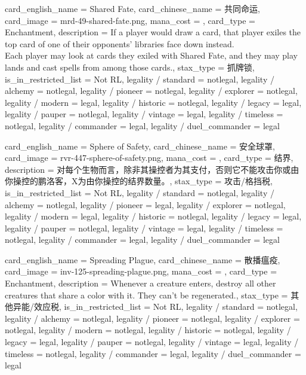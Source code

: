 \documentclass[lang = cn, color = black, 10pt]{AllThatStax}
\begin{document}
\card
{
	card_english_name = {Shared Fate},
	card_chinese_name = {共同命运},
	card_image = mrd-49-shared-fate.png,
	mana_cost = ,
	card_type = Enchantment,
	description = {If a player would draw a card, that player exiles the top card of one of their opponents' libraries face down instead.\\
		Each player may look at cards they exiled with Shared Fate, and they may play lands and cast spells from among those cards.},
	stax_type = 抓牌锁,
	is_in_restricted_list = Not RL,
	legality / standard = notlegal,
	legality / alchemy = notlegal,
	legality / pioneer = notlegal,
	legality / explorer = notlegal,
	legality / modern = legal,
	legality / historic = notlegal,
	legality / legacy = legal,
	legality / pauper = notlegal,
	legality / vintage = legal,
	legality / timeless = notlegal,
	legality / commander = legal,
	legality / duel_commander = legal
}

\card
{
	card_english_name = {Sphere of Safety},
	card_chinese_name = {安全球罩},
	card_image = rvr-447-sphere-of-safety.png,
	mana_cost = ,
	card_type = 结界,
	description = {对每个生物而言，除非其操控者为其支付，否则它不能攻击你或由你操控的鹏洛客，X为由你操控的结界数量。},
	stax_type = 攻击/格挡税,
	is_in_restricted_list = Not RL,
	legality / standard = notlegal,
	legality / alchemy = notlegal,
	legality / pioneer = legal,
	legality / explorer = notlegal,
	legality / modern = legal,
	legality / historic = notlegal,
	legality / legacy = legal,
	legality / pauper = notlegal,
	legality / vintage = legal,
	legality / timeless = notlegal,
	legality / commander = legal,
	legality / duel_commander = legal
}

\card
{
	card_english_name = {Spreading Plague},
	card_chinese_name = {散播瘟疫},
	card_image = inv-125-spreading-plague.png,
	mana_cost = ,
	card_type = Enchantment,
	description = {Whenever a creature enters, destroy all other creatures that share a color with it. They can't be regenerated.},
	stax_type = 其他异能/效应税,
	is_in_restricted_list = Not RL,
	legality / standard = notlegal,
	legality / alchemy = notlegal,
	legality / pioneer = notlegal,
	legality / explorer = notlegal,
	legality / modern = notlegal,
	legality / historic = notlegal,
	legality / legacy = legal,
	legality / pauper = notlegal,
	legality / vintage = legal,
	legality / timeless = notlegal,
	legality / commander = legal,
	legality / duel_commander = legal
}
\end{document}
